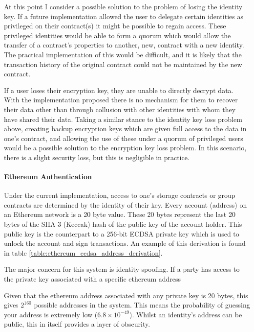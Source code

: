 At this point I consider a possible solution to the problem of losing the identity key. If a future implementation allowed the user to delegate certain identities as privileged on their contract(s) it might be possible to regain access. These privileged identities would be able to form a quorum which would allow the transfer of a contract's properties to another, new, contract with a new identity. The practical implementation of this would be difficult, and it is likely that the transaction history of the original contract could not be maintained by the new contract.

If a user loses their encryption key, they are unable to directly decrypt data. With the implementation proposed there is no mechanism for them to recover their data other than through collusion with other identities with whom they have shared their data. Taking a similar stance to the identity key loss problem above, creating backup encryption keys which are given full access to the data in one's contract, and allowing the use of these under a quorum of privileged users would be a possible solution to the encryption key loss problem. In this scenario, there is a slight security loss, but this is negligible in practice.

\paragraph{Ethereum Authentication}

Under the current implementation, access to one's storage contracts or group contracts are determined by the identity of their key. Every account (address) on an Ethereum network is a 20 byte value. These 20 bytes represent the last 20 bytes of the SHA-3 (Keccak) hash of the public key of the account holder. This public key is the counterpart to a 256-bit ECDSA private key which is used to unlock the account and sign transactions. An example of this derivation is found in table \ref{table:ethereum_ecdsa_address_derivation}.



The major concern for this system is identity spoofing. If a party has access to the private key associated with a specific ethereum address

Given that the ethereum address associated with any private key is 20 bytes, this gives $2^{160}$ possible addresses in the system. This means the probability of
guessing your address is extremely low ($6.8 \times 10^{-49}$). Whilst an identity's address can be public, this in itself provides a layer of obscurity.

